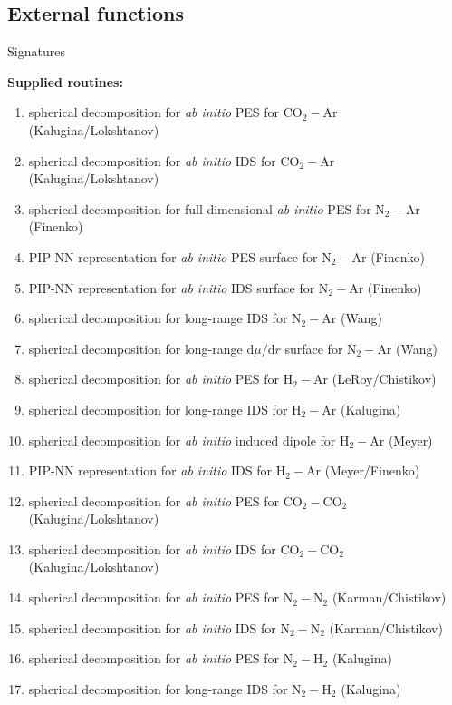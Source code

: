 \documentclass{article}
\begin{document}
\subsection{External functions}
\label{subsec:external-functions}

{\color{red} Signatures}

\noindent
\textbf{Supplied routines:}
\begin{enumerate}
\item spherical decomposition for \textit{ab initio} PES for CO$_2-$Ar (Kalugina/Lokshtanov) 
\item spherical decomposition for \textit{ab initio} IDS for CO$_2-$Ar (Kalugina/Lokshtanov)
\item spherical decomposition for full-dimensional \textit{ab initio} PES for N$_2-$Ar (Finenko)
\item PIP-NN representation for \textit{ab initio} PES surface for N$_2-$Ar (Finenko)
\item PIP-NN representation for \textit{ab initio} IDS surface for N$_2-$Ar (Finenko)
\item spherical decomposition for long-range IDS for N$_2-$Ar (Wang)
\item spherical decomposition for long-range $\textrm{d}\mu/\textrm{d}r$ surface for N$_2-$Ar (Wang)
\item spherical decomposition for \textit{ab initio} PES for H$_2-$Ar (LeRoy/Chistikov)
\item spherical decomposition for long-range IDS for H$_2-$Ar (Kalugina)
\item spherical decomposition for \textit{ab initio} induced dipole for H$_2-$Ar (Meyer)
\item PIP-NN representation for \textit{ab initio} IDS for H$_2-$Ar (Meyer/Finenko)
\item spherical decomposition for \textit{ab initio} PES for CO$_2-$CO$_2$ (Kalugina/Lokshtanov)
\item spherical decomposition for \textit{ab initio} IDS for CO$_2-$CO$_2$ (Kalugina/Lokshtanov)
\item spherical decomposition for \textit{ab initio} PES for N$_2-$N$_2$ (Karman/Chistikov)
\item spherical decomposition for \textit{ab initio} IDS for N$_2-$N$_2$ (Karman/Chistikov)
\item spherical decomposition for \textit{ab initio} PES for N$_2-$H$_2$ (Kalugina)
\item spherical decomposition for long-range IDS for N$_2-$H$_2$ (Kalugina)

\end{enumerate}
\end{document}
